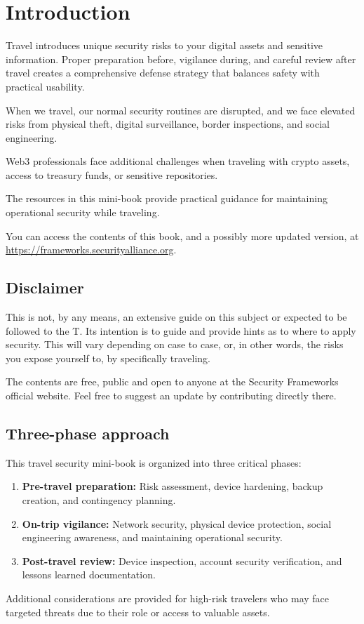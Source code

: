 \chapter{Introduction}

Travel introduces unique security risks to your digital
assets and sensitive information. Proper preparation
before, vigilance during, and careful review after travel
creates a comprehensive defense strategy that balances
safety with practical usability.

When we travel, our normal security routines are
disrupted, and we face elevated risks from physical theft,
digital surveillance, border inspections, and social
engineering.

Web3 professionals face additional challenges when
traveling with crypto assets, access to treasury funds, or
sensitive repositories.

The resources in this mini-book provide practical
guidance for maintaining operational security while
traveling.

You can access the contents of this book, and a possibly
more updated version, at
\url{https://frameworks.securityalliance.org}.

\section{Disclaimer}

This is not, by any means, an extensive guide on this
subject or expected to be followed to the T. Its intention
is to guide and provide hints as to where to apply
security. This will vary depending on case to case, or, in
other words, the risks you expose yourself to, by
specifically traveling.

The contents are free, public and open to anyone at the
Security Frameworks official website. Feel free to suggest
an update by contributing directly there.

\section{Three-phase approach}

This travel security mini-book is organized into three
critical phases:

\begin{enumerate}
  \item \textbf{Pre-travel preparation:} Risk assessment,
  device hardening, backup creation, and contingency
  planning.
  \item \textbf{On-trip vigilance:} Network security,
  physical device protection, social engineering
  awareness, and maintaining operational security.
  \item \textbf{Post-travel review:} Device inspection,
  account security verification, and lessons learned
  documentation.
\end{enumerate}

Additional considerations are provided for high-risk
travelers who may face targeted threats due to their role
or access to valuable assets.

